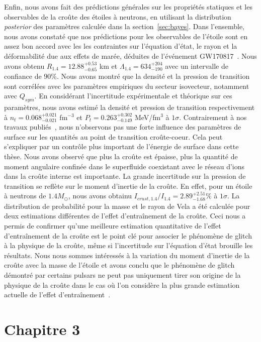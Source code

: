 Enfin, nous avons fait des prédictions générales sur les propriétés statiques 
et les observables de la croûte des étoiles à neutrons, en utilisant la 
distribution \textit{posterior} des paramètres calculée dans la 
section~\ref{sec:bayes}. Dans l'ensemble, nous avons constaté que nos 
prédictions pour les observables de l'étoile sont en assez bon accord avec les
les contraintes sur l'équation d'état, le rayon et la déformabilité due aux
effets de marée, déduites de l'événement GW170817~\cite{De2018,GW1}. Nous avons 
obtenu $R_{1.4}=12.88_{-0.65}^{+0.53}$ km et 
$\Lambda_{1.4} = 634_{-190}^{+204}$ avec un intervalle de confiance de $90\%$. 
%
Nous avons montré que la densité et la pression de transition sont 
corrélées avec les paramètres empiriques du secteur isovecteur, notamment avec 
$Q_{sym}$. En considérant l'incertitude expérimentale et théorique 
sur ces paramètres, nous avons estimé la densité et pression de transition
respectivement à $n_t=0.068_{-0.021}^{+0.021}$ fm$^{-3}$ et
$P_t=0.263_{-0.149}^{+0.302}$ MeV/fm$^3$ à $1\sigma$. Contrairement à nos 
travaux publiés~\cite{Carreau2019cc}, nous n'observons pas une forte influence
des paramètres de surface sur les quantités au point de transition 
croûte-coeur. Cela peut s'expliquer par un contrôle plus important de l'énergie 
de surface dans cette thèse. 
%
Nous avons observé que plus la croûte est épaisse, plus la quantité de moment 
angulaire confinée dans le superfluide coexistant avec le réseau d'ions 
dans la croûte interne est importante. 
La grande incertitude sur la pression de transition se reflète sur le moment
d'inertie de la croûte. En effet, pour un étoile à neutrons de $1.4M_\odot$, 
nous avons obtainu $I_{crust,1.4}/I_{1.4}=2.89_{-1.68}^{+2.51} \%$ à $1\sigma$. 
La distribution de probabilité pour la masse et le rayon de Vela a été calculée 
pour deux estimations différentes de l'effet d'entraînement de la croûte. 
Ceci nous a permis de confirmer qu'une meilleure estimation quantitative de
l'effet d'entraînement de la croûte est le point clé pour associer le phénomène 
de glitch à la physique de la croûte, même si l'incertitude sur l'équation
d'état brouille les résultats. Nous nous sommes intéressés à la variation du 
moment d'inertie de la croûte avec la masse de l'étoile et avons conclu que le 
phénomène de glitch démontré par certains pulsars ne peut pas uniquement tirer 
son origine de la physique de la croûte dans le cas où l'on considère la plus 
grande estimation actuelle de l'effet d'entraînement~\cite{Delsate2016}.

\section{Chapitre 3}

